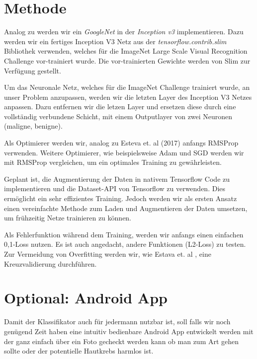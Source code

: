 \documentclass[%
   10pt,              %
   a4paper,           %
   DIV10,             %
]{scrartcl}%
\begin{document}
\section*{Methode}

Analog zu \cite{skincancer} werden wir ein \textit{GoogleNet} in der \textit{Inception v3} \cite{inception} implementieren. Dazu werden wir ein fertiges Inception V3 Netz aus der \textit{tensorflow.contrib.slim} Bibliothek verwenden, welches für die ImageNet Large Scale Visual Recognition Challenge \cite{ILSVRC15} vor-trainiert wurde. Die vor-trainierten Gewichte werden von Slim zur Verfügung gestellt. 

\noindent Um das Neuronale Netz, welches für die ImageNet Challenge trainiert wurde, an unser Problem anzupassen, werden wir die letzten Layer des Inception V3 Netzes anpassen. Dazu entfernen wir die letzen Layer und ersetzen diese durch eine vollständig verbundene Schicht, mit einem Outputlayer von zwei Neuronen (maligne, benigne). 

\noindent Als Optimierer werden wir, analog zu Esteva et. al (2017) \cite{skincancer} anfangs RMSProp verwenden. Weitere Optimierer, wie beispielsweise Adam und SGD werden wir mit RMSProp vergleichen, um ein optimales Training zu gewährleisten.

\noindent Geplant ist, die Augmentierung der Daten in nativem Tensorflow Code zu implementieren und die Dataset-API von Tensorflow zu verwenden. Dies ermöglicht ein sehr effizientes Training. Jedoch werden wir als ersten Ansatz einen vereinfachte Methode zum Laden und Augmentieren der Daten umsetzen, um frühzeitig Netze trainieren zu können.

\noindent Als Fehlerfunktion während dem Training, werden wir anfangs einen einfachen 0,1-Loss nutzen. Es ist auch angedacht, andere Funktionen (L2-Loss) zu testen. 
 Zur Vermeidung von Overfitting werden wir, wie Estava et. al \cite{skincancer}, eine Kreuzvalidierung durchführen. 

\section*{Optional: Android App}
Damit der Klassifikator auch für jedermann nutzbar ist, soll falls wir noch genügend Zeit haben eine intuitiv bedienbare Android App entwickelt werden mit der ganz einfach über ein Foto gecheckt werden kann ob man zum Art gehen sollte oder der potentielle Hautkrebs harmlos ist.
\end{document}
